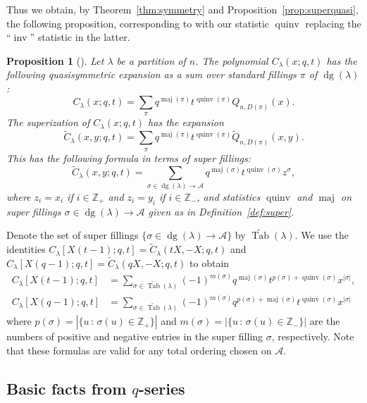 \documentclass[11pt]{article}
\newtheorem{proposition}[theo]{Proposition}
\theoremstyle{definition}
\numberwithin{equation}{section}
\DeclareMathOperator{\PQT}{Tab}
\DeclareMathOperator{\dg}{dg}
\DeclareMathOperator{\maj}{maj}
\DeclareMathOperator{\inv}{inv}
\DeclareMathOperator{\quinv}{quinv}
\begin{document}
Thus we obtain, by Theorem~\ref{thm:symmetry} and Proposition~\ref{prop:superquasi}, the following proposition, corresponding to \cite[Proposition 4.3]{HHL05} with our statistic $\quinv$ replacing the ``$\inv$'' statistic in the latter.

\begin{proposition}[{\cite[Proposition 4.3]{HHL05}}]
Let $\lambda$ be a partition of $n$. The polynomial $C_{\lambda}(x;q,t)$ has the following quasisymmetric expansion as a sum over standard fillings $\pi$ of $\dg(\lambda)$:
\[
C_{\lambda}(x;q,t) = \sum_{\pi} q^{\maj(\pi)}t^{\quinv(\pi)}Q_{n,D(\pi)}(x).
\]
The superization of $C_{\lambda}(x;q,t)$ has the expansion
\[
\widetilde{C}_{\lambda}(x,y;q,t) = \sum_{\pi} q^{\maj(\pi)}t^{\quinv(\pi)}\widetilde{Q}_{n,D(\pi)}(x,y).
\]
This has the following formula in terms of super fillings:
\[
\widetilde{C}_{\lambda}(x,y;q,t) = \sum_{\sigma\in \dg(\lambda) \rightarrow \mathcal{A}} q^{\maj(\sigma)}t^{\quinv(\sigma)}z^{\sigma},
\] 
where $z_i = x_i$ if $i\in\mathbb{Z}_+$ and $z_i = y_i$ if $i\in\mathbb{Z}_-$, and statistics $\quinv$ and $\maj$ on super fillings $\sigma\in \dg(\lambda) \rightarrow \mathcal{A}$ given as in Definition~\ref{def:super}. 
\end{proposition}

Denote the set of super fillings $\{\sigma\in \dg(\lambda) \rightarrow \mathcal{A}\}$ by $\widetilde{\PQT}(\lambda)$. We use the identities $C_{\lambda}[X(t-1);q,t]=\widetilde{C}_{\lambda}(tX,-X;q,t)$ and $C_{\lambda}[X(q-1);q,t]=\widetilde{C}_{\lambda}(qX,-X;q,t)$ to obtain
\begin{align}
C_{\lambda}[X(t-1);q,t]& = \sum_{\sigma\in \widetilde{\PQT}(\lambda)} (-1)^{m(\sigma)} q^{\maj(\sigma)}t^{p(\sigma)+\quinv(\sigma)}x^{|\sigma|}, \label{C1}\\
C_{\lambda}[X(q-1);q,t]& = \sum_{\sigma\in \widetilde{\PQT}(\lambda)} (-1)^{m(\sigma)} q^{p(\sigma)+\maj(\sigma)}t^{\quinv(\sigma)}x^{|\sigma|} \label{C2}
\end{align}
where $p(\sigma) = |\{u\,:\,\sigma(u)\in\mathbb{Z}_+\}|$ and $m(\sigma) = |\{u\,:\,\sigma(u)\in\mathbb{Z}_-\}|$ are the numbers of positive and negative entries in the super filling $\sigma$, respectively. Note that these formulas are valid for any total ordering chosen on $\mathcal{A}$. 

\subsection{Basic facts from $q$-series}\label{sec:qseries}
\end{document}
